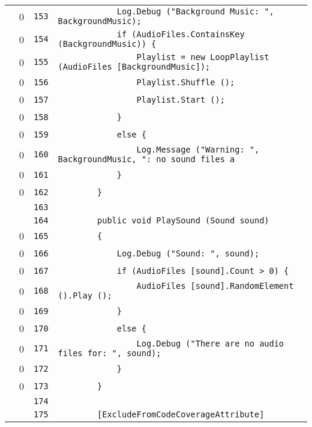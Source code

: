 \documentclass[a4paper,10pt]{article}
\begin{document}
\begin{longtable}[l]{lrrl}
\cellcolor{red} & 0 & \verb~153~ & \verb~            Log.Debug ("Background Music: ", BackgroundMusic);~\\
\cellcolor{red} & 0 & \verb~154~ & \verb~            if (AudioFiles.ContainsKey (BackgroundMusic)) {~\\
\cellcolor{red} & 0 & \verb~155~ & \verb~                Playlist = new LoopPlaylist (AudioFiles [BackgroundMusic]);~\\
\cellcolor{red} & 0 & \verb~156~ & \verb~                Playlist.Shuffle ();~\\
\cellcolor{red} & 0 & \verb~157~ & \verb~                Playlist.Start ();~\\
\cellcolor{red} & 0 & \verb~158~ & \verb~            }~\\
\cellcolor{red} & 0 & \verb~159~ & \verb~            else {~\\
\cellcolor{red} & 0 & \verb~160~ & \verb~                Log.Message ("Warning: ", BackgroundMusic, ": no sound files a~\\
\cellcolor{red} & 0 & \verb~161~ & \verb~            }~\\
\cellcolor{red} & 0 & \verb~162~ & \verb~        }~\\
\cellcolor{gray} &  & \verb~163~ & \verb~~\\
\cellcolor{gray} &  & \verb~164~ & \verb~        public void PlaySound (Sound sound)~\\
\cellcolor{red} & 0 & \verb~165~ & \verb~        {~\\
\cellcolor{red} & 0 & \verb~166~ & \verb~            Log.Debug ("Sound: ", sound);~\\
\cellcolor{red} & 0 & \verb~167~ & \verb~            if (AudioFiles [sound].Count > 0) {~\\
\cellcolor{red} & 0 & \verb~168~ & \verb~                AudioFiles [sound].RandomElement ().Play ();~\\
\cellcolor{red} & 0 & \verb~169~ & \verb~            }~\\
\cellcolor{red} & 0 & \verb~170~ & \verb~            else {~\\
\cellcolor{red} & 0 & \verb~171~ & \verb~                Log.Debug ("There are no audio files for: ", sound);~\\
\cellcolor{red} & 0 & \verb~172~ & \verb~            }~\\
\cellcolor{red} & 0 & \verb~173~ & \verb~        }~\\
\cellcolor{gray} &  & \verb~174~ & \verb~~\\
\cellcolor{gray} &  & \verb~175~ & \verb~        [ExcludeFromCodeCoverageAttribute]~\\

\end{longtable}
\end{document}
